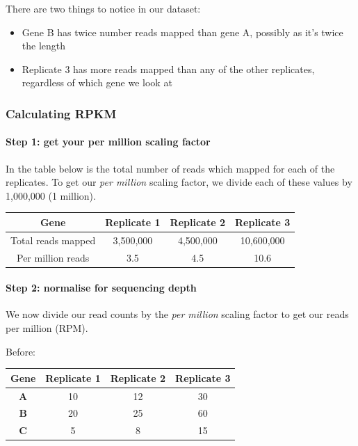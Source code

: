 \documentclass[11pt]{article}
\begin{document}
There are two things to notice in our dataset:

\begin{itemize}
\item
  Gene B has twice number reads mapped than gene A, possibly as it's
  twice the length
\item
  Replicate 3 has more reads mapped than any of the other replicates,
  regardless of which gene we look at
\end{itemize}

\hypertarget{calculating-rpkm}{%
\subsubsection{Calculating RPKM}\label{calculating-rpkm}}

\hypertarget{step-1-get-your-per-million-scaling-factor}{%
\paragraph{Step 1: get your per million scaling
factor}\label{step-1-get-your-per-million-scaling-factor}}

In the table below is the total number of reads which mapped for each of
the replicates. To get our \textit{per million} scaling factor, we divide
each of these values by 1,000,000 (1 million).

\begin{longtable}[]{@{}cccc@{}}
\toprule
Gene & Replicate 1 & Replicate 2 & Replicate 3\tabularnewline
\midrule
\endhead
Total reads mapped & 3,500,000 & 4,500,000 & 10,600,000\tabularnewline
Per million reads & 3.5 & 4.5 & 10.6\tabularnewline
\bottomrule
\end{longtable}

\hypertarget{step-2-normalise-for-sequencing-depth}{%
\paragraph{Step 2: normalise for sequencing
depth}\label{step-2-normalise-for-sequencing-depth}}

We now divide our read counts by the \textit{per million} scaling factor
to get our reads per million (RPM).

Before:

\begin{longtable}[]{@{}cccc@{}}
\toprule
Gene & Replicate 1 & Replicate 2 & Replicate 3\tabularnewline
\midrule
\endhead
\textbf{A} & 10 & 12 & 30\tabularnewline
\textbf{B} & 20 & 25 & 60\tabularnewline
\textbf{C} & 5 & 8 & 15\tabularnewline
\bottomrule
\end{longtable}
\end{document}
